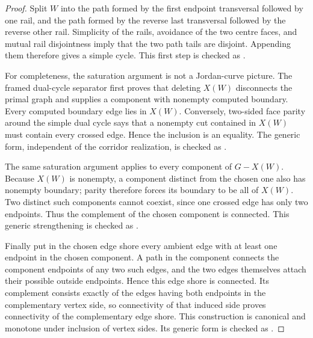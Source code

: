 \begin{proof}
Split $W$ into the path formed by the first endpoint transversal followed
by one rail, and the path formed by the reverse last transversal followed by
the reverse other rail.  Simplicity of the rails, avoidance of the two centre
faces, and mutual rail disjointness imply that the two path tails are
disjoint.  Appending them therefore gives a simple cycle.  This first step is
checked as
.

For completeness, the saturation argument is not a Jordan-curve picture.
The framed dual-cycle separator first proves that deleting $X(W)$
disconnects the primal graph and supplies a component with nonempty computed
boundary.  Every computed boundary edge lies in $X(W)$.  Conversely,
two-sided face parity around the simple dual cycle says that a nonempty cut
contained in $X(W)$ must contain every crossed edge.  Hence the inclusion is
an equality.  The generic form, independent of the corridor realization, is
checked as
.

The same saturation argument applies to every component of $G-X(W)$.
Because $X(W)$ is nonempty, a component distinct from the chosen one also
has nonempty boundary; parity therefore forces its boundary to be all of
$X(W)$.  Two distinct such components cannot coexist, since one crossed
edge has only two endpoints.  Thus the complement of the chosen component
is connected.  This generic strengthening is checked as
.

Finally put in the chosen edge shore every ambient edge with at least one
endpoint in the chosen component.  A path in the component connects the
component endpoints of any two such edges, and the two edges themselves
attach their possible outside endpoints.  Hence this edge shore is
connected.  Its complement consists exactly of the edges having both
endpoints in the complementary vertex side, so connectivity of that induced
side proves connectivity of the complementary edge shore.  This construction
is canonical and monotone under inclusion of vertex sides.  Its generic form
is checked as
.
\end{proof}

